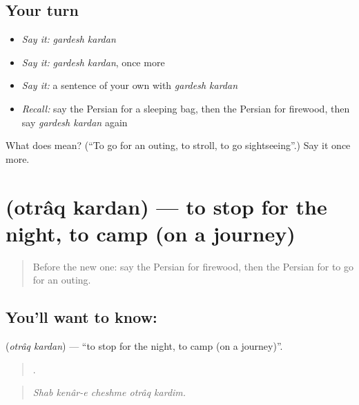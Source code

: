 \subsection*{Your turn}
\begin{itemize}
\raggedright
  \item \emph{Say it:} \emph{gardesh kardan}
  \item \emph{Say it:} \emph{gardesh kardan}, once more
  \item \emph{Say it:} a sentence of your own with \emph{gardesh kardan}
  \item \emph{Recall:} say the Persian for a sleeping bag, then the Persian for firewood, then say \emph{gardesh kardan} again
\end{itemize}

\begin{tcolorbox}[breakable,colback=teal!4,colframe=teal!35!black,title={Before you move on}]
What does   mean? (\textquotedblleft{}To go for an outing, to stroll, to go sightseeing\textquotedblright{}.) Say it once more.
\end{tcolorbox}
\section[\texorpdfstring{\fa{اتراق} \fa{کردن} (otrâq kardan)}{اتراق کردن (otrâq kardan)}]{  (otrâq kardan) — to stop for the night, to camp (on a journey)}

\label{lesson:FA-C470-otraq-kardan}



\begin{quote}
Before the new one: say the Persian for firewood, then the Persian for to go for an outing.
\end{quote}

\subsection*{You'll want to know:  }
\textbf{ } (\emph{otrâq kardan}) — \textquotedblleft{}to stop for the night, to camp (on a journey)\textquotedblright{}.

\begin{quote}
    .
\end{quote}

\begin{quote}
\emph{Shab kenâr-e cheshme otrâq kardim.}
\end{quote}

